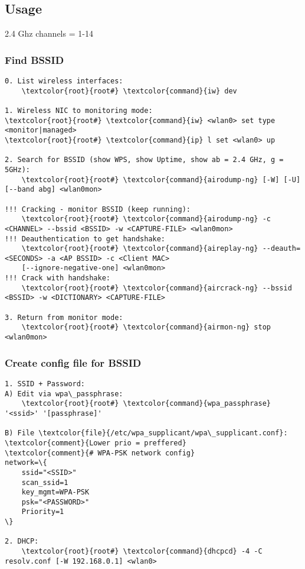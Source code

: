 \documentclass[10pt, a4paper, onecolumn, openany]{book}         %
\begin{document}
\subsection{Usage}
2.4 Ghz channels = 1-14
\subsubsection{Find BSSID}
\begin{Verbatim}[commandchars=\\\{\}]
0. List wireless interfaces:
    \textcolor{root}{root#} \textcolor{command}{iw} dev
    
1. Wireless NIC to monitoring mode:
\textcolor{root}{root#} \textcolor{command}{iw} <wlan0> set type <monitor|managed>
\textcolor{root}{root#} \textcolor{command}{ip} l set <wlan0> up

2. Search for BSSID (show WPS, show Uptime, show ab = 2.4 GHz, g = 5GHz):
    \textcolor{root}{root#} \textcolor{command}{airodump-ng} [-W] [-U] [--band abg] <wlan0mon>

!!! Cracking - monitor BSSID (keep running):
    \textcolor{root}{root#} \textcolor{command}{airodump-ng} -c <CHANNEL> --bssid <BSSID> -w <CAPTURE-FILE> <wlan0mon>
!!! Deauthentication to get handshake:
    \textcolor{root}{root#} \textcolor{command}{aireplay-ng} --deauth=<SECONDS> -a <AP BSSID> -c <Client MAC>
    [--ignore-negative-one] <wlan0mon>
!!! Crack with handshake:
    \textcolor{root}{root#} \textcolor{command}{aircrack-ng} --bssid <BSSID> -w <DICTIONARY> <CAPTURE-FILE>
    
3. Return from monitor mode:
    \textcolor{root}{root#} \textcolor{command}{airmon-ng} stop <wlan0mon>
\end{Verbatim}

\subsubsection{Create config file for BSSID}
\begin{Verbatim}[commandchars=\\\{\}]
1. SSID + Password:
A) Edit via wpa\_passphrase:
    \textcolor{root}{root#} \textcolor{command}{wpa_passphrase} '<ssid>' '[passphrase]'
    
B) File \textcolor{file}{/etc/wpa_supplicant/wpa\_supplicant.conf}:
\textcolor{comment}{Lower prio = preffered}
\textcolor{comment}{# WPA-PSK network config}
network=\{
    ssid="<SSID>"
    scan_ssid=1
    key_mgmt=WPA-PSK
    psk="<PASSWORD>"
    Priority=1
\}

2. DHCP:
    \textcolor{root}{root#} \textcolor{command}{dhcpcd} -4 -C resolv.conf [-W 192.168.0.1] <wlan0>
\end{Verbatim}
\end{document}
